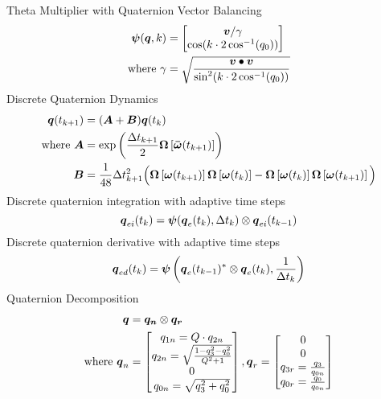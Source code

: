 \begin{nomenclature}
Theta Multiplier with Quaternion Vector Balancing\\
\begin{equation}
  \begin{aligned}
    \boldsymbol{\psi}(\boldsymbol{q}, k) &= \begin{bmatrix} \boldsymbol{v} / \gamma \\ \cos ( k \cdot 2\cos^{-1} (q_0))  \end{bmatrix} \\
    \text{where } \gamma &= \sqrt{\frac{\boldsymbol{v} \bullet \boldsymbol{v}}{\sin^2 ( k \cdot 2\cos^{-1} (q_0))}}
   \end{aligned}
\end{equation}
Discrete Quaternion Dynamics
\begin{equation}
  \begin{aligned}
    \boldsymbol{q}(t_{k+1}) &= ( \boldsymbol{A} + \boldsymbol{B} ) \boldsymbol{q}(t_{k}) \\
    \text{where } \boldsymbol{A} &= \exp \left( \frac{\Delta t_{k+1}}{2} \boldsymbol{\Omega} \left[ \boldsymbol{\bar{\omega}}(t_{k+1}) \right] \right)\\
    \boldsymbol{B} &= \frac{1}{48} \Delta t_{k+1}^2 \Big(
    \boldsymbol{\Omega} \left[\boldsymbol{\omega}(t_{k+1}) \right]
    \boldsymbol{\Omega} \left[\boldsymbol{\omega}(t_{k})   \right] -
    \boldsymbol{\Omega} \left[\boldsymbol{\omega}(t_{k})   \right]
    \boldsymbol{\Omega} \left[\boldsymbol{\omega}(t_{k+1}) \right]
      \Big)
  \end{aligned}
\end{equation}
Discrete quaternion integration with adaptive time steps\\
\begin{equation} \boldsymbol{q}_{ei}(t_k) = \boldsymbol{\psi}(\boldsymbol{q}_e(t_{k}), \Delta t_{k}) \otimes \boldsymbol{q}_{ei}(t_{k-1}) \end{equation}
Discrete quaternion derivative with adaptive time steps\\
\begin{equation} \boldsymbol{q}_{ed}(t_k) = \boldsymbol{\psi}\left(\boldsymbol{q}_e(t_{k-1})^* \otimes \boldsymbol{q}_e(t_{k}), \frac{1}{\Delta t_{k}}\right) \end{equation}
Quaternion Decomposition
\begin{equation}
  \begin{aligned}
    \bs{q} &= \bs{q_n} \otimes \bs{q_r} \\
    \text{where } \bs{q}_n &= \begin{bmatrix} q_{1n} = Q \cdot q_{2n} \\ q_{2n} = \sqrt{ \frac{1  - q_3^2 - q_0^2}{Q^2 + 1} } \\ 0 \\ q_{0n} = \sqrt{q_3^2 + q_0^2} \end{bmatrix} , \bs{q}_r = \begin{bmatrix} 0 \\ 0 \\ q_{3r} = \frac{q_3}{q_{0n}} \\ q_{0r} = \frac{q_0}{q_{0n}} \end{bmatrix} \\

\end{aligned}
\end{equation}
\end{nomenclature}
